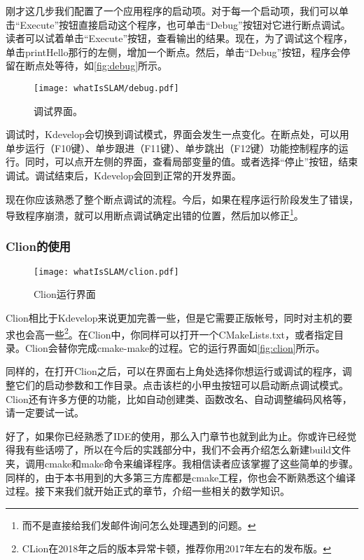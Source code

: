 刚才这几步我们配置了一个应用程序的启动项。对于每一个启动项，我们可以单击“Execute”按钮直接启动这个程序，也可单击“Debug”按钮对它进行断点调试。读者可以试着单击“Execute”按钮，查看输出的结果。现在，为了调试这个程序，单击printHello那行的左侧，增加一个断点。然后，单击“Debug”按钮，程序会停留在断点处等待，如\autoref{fig:debug}所示。

\begin{figure}[!htp]
	\centering
	\texttt{[image: whatIsSLAM/debug.pdf]}
	\caption{调试界面。}
	\label{fig:debug}
\end{figure}

调试时，Kdevelop会切换到调试模式，界面会发生一点变化。在断点处，可以用单步运行（F10键）、单步跟进（F11键）、单步跳出（F12键）功能控制程序的运行。同时，可以点开左侧的界面，查看局部变量的值。或者选择“停止”按钮，结束调试。调试结束后，Kdevelop会回到正常的开发界面。

现在你应该熟悉了整个断点调试的流程。今后，如果在程序运行阶段发生了错误，导致程序崩溃，就可以用断点调试确定出错的位置，然后加以修正\footnote{而不是直接给我们发邮件询问怎么处理遇到的问题。}。

\subsubsection{Clion的使用}
\begin{figure}[!t]
	\centering
	\texttt{[image: whatIsSLAM/clion.pdf]}
	\caption{Clion运行界面}
	\label{fig:clion}
\end{figure}
Clion相比于Kdevelop来说更加完善一些，但是它需要正版帐号，同时对主机的要求也会高一些\footnote{CLion在2018年之后的版本异常卡顿，推荐你用2017年左右的发布版。}。在Clion中，你同样可以打开一个CMakeLists.txt，或者指定目录。Clion会替你完成cmake-make的过程。它的运行界面如\autoref{fig:clion}所示。

同样的，在打开Clion之后，可以在界面右上角处选择你想运行或调试的程序，调整它们的启动参数和工作目录。点击该栏的小甲虫按钮可以启动断点调试模式。Clion还有许多方便的功能，比如自动创建类、函数改名、自动调整编码风格等，请一定要试一试。

好了，如果你已经熟悉了IDE的使用，那么入门章节也就到此为止。你或许已经觉得我有些话唠了，所以在今后的实践部分中，我们不会再介绍怎么新建build文件夹，调用cmake和make命令来编译程序。我相信读者应该掌握了这些简单的步骤。同样的，由于本书用到的大多第三方库都是cmake工程，你也会不断熟悉这个编译过程。接下来我们就开始正式的章节，介绍一些相关的数学知识。


